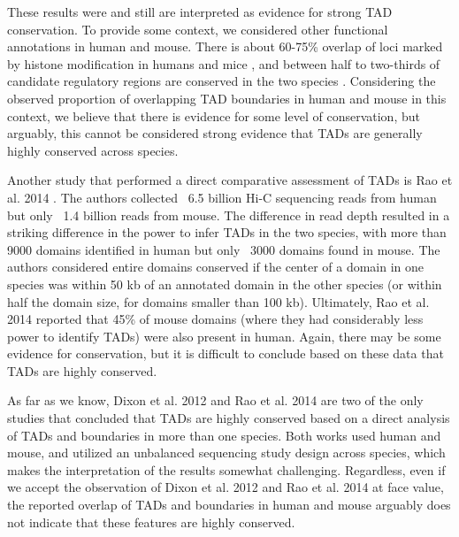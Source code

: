 These results were and still are interpreted as evidence for strong TAD conservation. To provide some context, we considered other functional annotations in human and mouse. There is about 60-75\% overlap of loci marked by histone modification in humans and mice \cite{Woo.2012}, and between half to two-thirds of candidate regulatory regions are conserved in the two species \cite{Yue.2014}. Considering the observed proportion of overlapping TAD boundaries in human and mouse in this context, we believe that there is evidence for some level of conservation, but arguably, this cannot be considered strong evidence that TADs are generally highly conserved across species.

Another study that performed a direct comparative assessment of TADs is Rao et al. 2014 \cite{Rao.2014}. The authors collected ~6.5 billion Hi-C sequencing reads from human but only ~1.4 billion reads from mouse. The difference in read depth resulted in a striking difference in the power to infer TADs in the two species, with more than 9000 domains identified in human but only ~3000 domains found in mouse. The authors considered entire domains conserved if the center of a domain in one species was within 50 kb of an annotated domain in the other species (or within half the domain size, for domains smaller than 100 kb). Ultimately, Rao et al. 2014 reported that 45\% of mouse domains (where they had considerably less power to identify TADs) were also present in human. Again, there may be some evidence for conservation, but it is difficult to conclude based on these data that TADs are highly conserved. 

As far as we know, Dixon et al. 2012 and Rao et al. 2014 are two of the only studies that concluded that TADs are highly conserved based on a direct analysis of TADs and boundaries in more than one species. Both works used human and mouse, and utilized an unbalanced sequencing study design across species, which makes the interpretation of the results somewhat challenging. Regardless, even if we accept the observation of Dixon et al. 2012 and Rao et al. 2014 at face value, the reported overlap of TADs and boundaries in human and mouse arguably does not indicate that these features are highly conserved.

